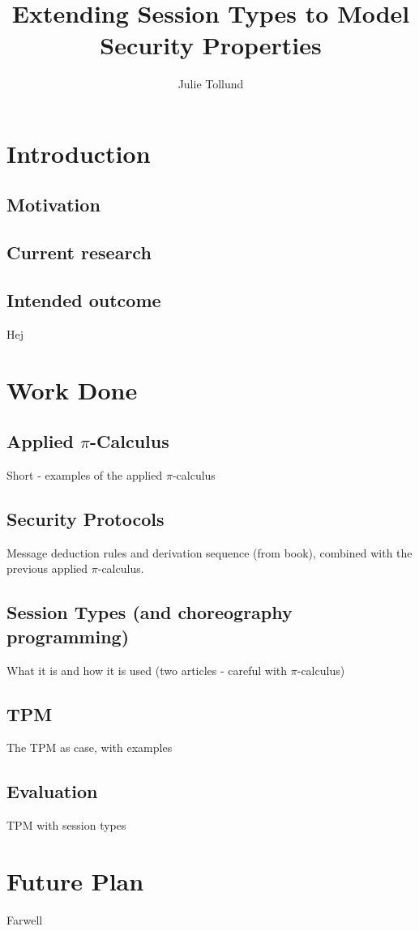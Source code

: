 \documentclass[a4paper,12pt]{report}
\title{Extending Session Types to Model Security Properties}
\author{Julie Tollund}
\begin{document}
\maketitle

\chapter{Introduction}
\section{Motivation}
\section{Current research}

\section{Intended outcome}

Hej

\chapter{Work Done}
\section{Applied $\pi$-Calculus}
Short - examples of the applied $\pi$-calculus 
\section{Security Protocols}
Message deduction rules and derivation sequence (from book), combined with the previous applied $\pi$-calculus. 
\section{Session Types (and choreography programming)}
What it is and how it is used (two articles - careful with $\pi$-calculus)
\section{TPM}
The TPM as case, with examples
\section{Evaluation}
TPM with session types

\chapter{Future Plan}

Farwell
\end{document}
